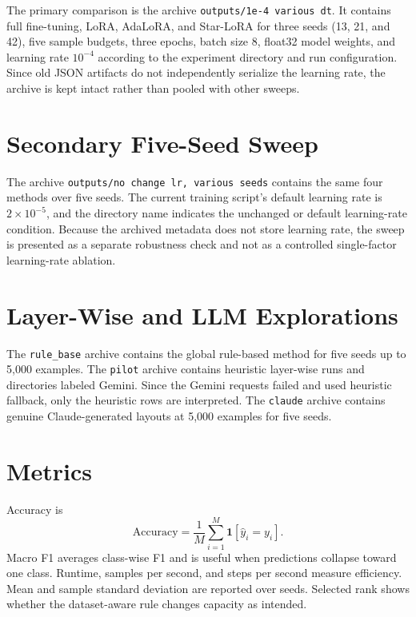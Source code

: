 The primary comparison is the archive \texttt{outputs/1e-4 various dt}. It contains full
fine-tuning, LoRA, AdaLoRA, and Star-LoRA for three seeds (13, 21, and 42), five sample budgets,
three epochs, batch size 8, float32 model weights, and learning rate $10^{-4}$ according to the
experiment directory and run configuration. Since old JSON artifacts do not independently
serialize the learning rate, the archive is kept intact rather than pooled with other sweeps.

\section{Secondary Five-Seed Sweep}

The archive \texttt{outputs/no change lr, various seeds} contains the same four methods over five
seeds. The current training script's default learning rate is $2\times10^{-5}$, and the directory
name indicates the unchanged or default learning-rate condition. Because the archived metadata
does not store learning rate, the sweep is presented as a separate robustness check and not as a
controlled single-factor learning-rate ablation.

\section{Layer-Wise and LLM Explorations}

The \texttt{rule\_base} archive contains the global rule-based method for five seeds up to 5,000
examples. The \texttt{pilot} archive contains heuristic layer-wise runs and directories labeled
Gemini. Since the Gemini requests failed and used heuristic fallback, only the heuristic rows are
interpreted. The \texttt{claude} archive contains genuine Claude-generated layouts at 5,000
examples for five seeds.

\section{Metrics}

Accuracy is
\begin{equation}
  \mathrm{Accuracy} = \frac{1}{M}\sum_{i=1}^{M}
  \mathbf{1}[\hat{y}_i=y_i].
\end{equation}
Macro F1 averages class-wise F1 and is useful when predictions collapse toward one class.
Runtime, samples per second, and steps per second measure efficiency. Mean and sample standard
deviation are reported over seeds. Selected rank shows whether the dataset-aware rule changes
capacity as intended.

